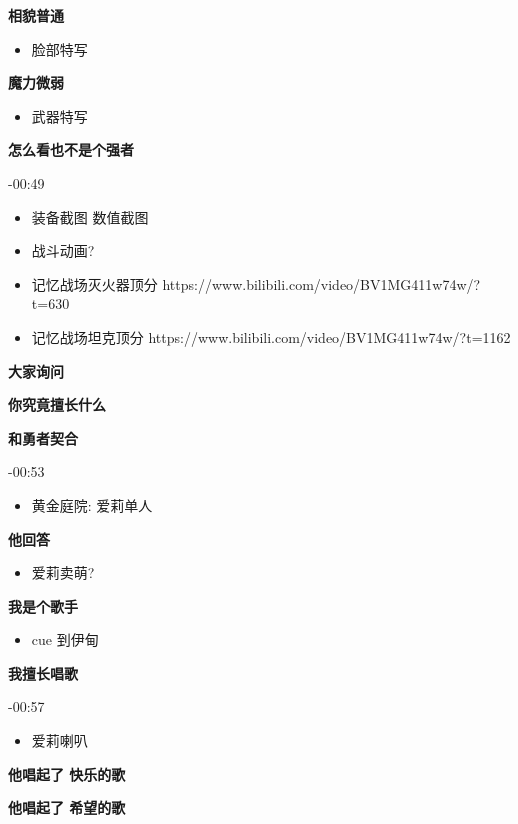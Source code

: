 \documentclass[a4paper]{article}
\begin{document}
\textbf{相貌普通}

\begin{itemize}
    \item 脸部特写
\end{itemize}

\textbf{魔力微弱}

\begin{itemize}
    \item 武器特写
\end{itemize}

\textbf{怎么看也不是个强者}

-00:49

\begin{itemize}
    \item 装备截图 数值截图
    \item 战斗动画?
    \item 记忆战场灭火器顶分 https://www.bilibili.com/video/BV1MG411w74w/?t=630
    \item 记忆战场坦克顶分 https://www.bilibili.com/video/BV1MG411w74w/?t=1162
\end{itemize}

\textbf{大家询问}

\textbf{你究竟擅长什么}

\textbf{和勇者契合}

-00:53

\begin{itemize}
    \item 黄金庭院: 爱莉单人
\end{itemize}

\textbf{他回答}

\begin{itemize}
    \item 爱莉卖萌?
\end{itemize}

\textbf{我是个歌手}

\begin{itemize}
    \item cue 到伊甸
\end{itemize}

\textbf{我擅长唱歌}

-00:57

\begin{itemize}
    \item 爱莉喇叭
\end{itemize}

\textbf{他唱起了 快乐的歌}

\textbf{他唱起了 希望的歌}
\end{document}
